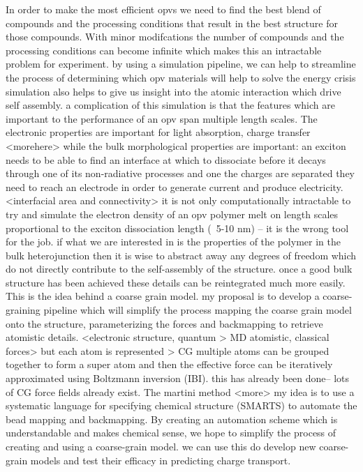In order to make the most efficient opvs we need to find the best blend of compounds and the processing conditions that result in the best structure for those compounds. With minor modifcations the number of compounds and the processing conditions can become infinite which makes this an intractable problem for experiment.
by using a simulation pipeline, we can help to streamline the process of determining which opv materials will help to solve the energy crisis
simulation also helps to give us insight into the atomic interaction which drive self assembly.
a complication of this simulation is that the features which are important to the performance of an opv span multiple length scales. The electronic properties are important for light absorption, charge transfer <morehere>
while the bulk morphological properties are important: an exciton needs to be able to find an interface at which to dissociate before it decays through one of its non-radiative processes and one the charges are separated they need to reach an electrode in order to generate current and produce electricity. <interfacial area and connectivity>
it is not only computationally intractable to try and simulate the electron density of an opv polymer melt on length scales proportional to the exciton dissociation length (~5-10 nm) -- it is the wrong tool for the job. if what we are interested in is the properties of the polymer in the bulk heterojunction then it is wise to abstract away any degrees of freedom which do not directly contribute to the self-assembly of the structure. once a good bulk structure has been achieved these details can be reintegrated much more easily. This is the idea behind a coarse grain model.
my proposal is to develop a coarse-graining pipeline which will simplify the process mapping the coarse grain model onto the structure, parameterizing the forces and backmapping to retrieve atomistic details. 
<electronic structure, quantum > MD atomistic, classical forces> but each atom is represented > CG multiple atoms can be grouped together to form a super atom and then the effective force can be iteratively approximated using Boltzmann inversion (IBI). 
this has already been done-- lots of CG force fields already exist. The martini method <more> 
my idea is to use a systematic language for specifying chemical structure (SMARTS) to automate the bead mapping and backmapping. 
By creating an automation scheme which is understandable and makes chemical sense, we hope to simplify the process of creating and using a coarse-grain model.
we can use this do develop new coarse-grain models and test their efficacy in predicting charge transport.
